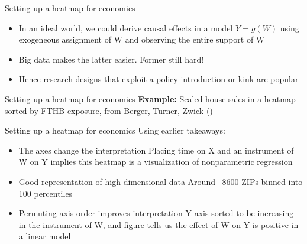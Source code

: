 \begin{frame}{Setting up a heatmap for economics}

        \begin{itemize}
                \item<1-> In an ideal world, we could derive causal effects in a model $Y = g(W)$
        using exogeneous assignment of W and observing the entire support of W
                \item<2-> Big data makes the latter easier. Former still hard!
                \item<2-> Hence research designs that exploit a policy introduction or kink are popular
        \end{itemize}

\end{frame}


\begin{frame}{Setting up a heatmap for economics}
        \textbf{Example:} Scaled house sales in a heatmap sorted by FTHB exposure,
                          from Berger, Turner, Zwick ()

    \vspace{0.1in}
    \centering

\end{frame}


\begin{frame}{Setting up a heatmap for economics}
        Using earlier takeaways:

        \begin{itemize}
                \item<1-> The axes change the interpretation \newline
                      \footnotesize
                      Placing time on X and an instrument of W on Y implies
                      this heatmap is a visualization of nonparametric regression
              \item<2-> \normalsize Good representation of high-dimensional data \newline
                       \footnotesize
                       Around ~8600 ZIPs binned into 100 percentiles
               \item<3-> \normalsize Permuting axis order improves interpretation \newline
                      \footnotesize
                      Y axis sorted to be increasing in the instrument of W,
                      and figure tells us the effect of W on Y is positive in a linear model
        \end{itemize}
\end{frame}


